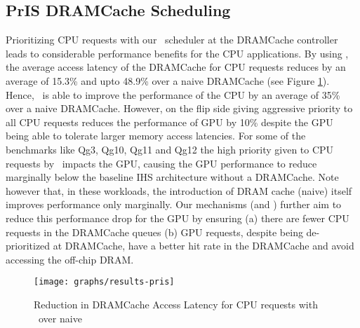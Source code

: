 \subsection{PrIS DRAMCache Scheduling}
Prioritizing CPU requests with our \prioname\ scheduler at the DRAMCache controller leads to considerable performance benefits for the CPU applications. By using \prioname, the average access latency of the DRAMCache for CPU requests reduces by an average of 15.3\% and upto 48.9\% over a naive DRAMCache (see Figure \ref{results-pris}). Hence, \prioname\ is able to improve the performance of the CPU by an average of 35\% over a naive DRAMCache. However, on the flip side giving aggressive priority to all CPU requests reduces the performance of GPU by 10\% despite the GPU being able to tolerate larger memory access latencies. For some of the benchmarks like Qg3, Qg10, Qg11 and Qg12 the high priority given to CPU requests by \prioname\ impacts the GPU, causing the GPU performance to reduce marginally below the baseline IHS architecture without a DRAMCache. Note however that, in these workloads, the introduction of DRAM cache (naive) itself improves performance only marginally. Our mechanisms (\bypassname and \chaining) further aim to reduce this performance drop for the GPU by ensuring (a) there are fewer CPU requests in the DRAMCache queues (b) GPU requests, despite being de-prioritized at DRAMCache, have a better hit rate in the DRAMCache and avoid accessing the off-chip DRAM.

\begin{figure}[htb]
	\centering
	\texttt{[image: graphs/results-pris]}
	\caption{Reduction in DRAMCache Access Latency for CPU requests with \prioname\ over naive}
	\label{results-pris}
\end{figure}

